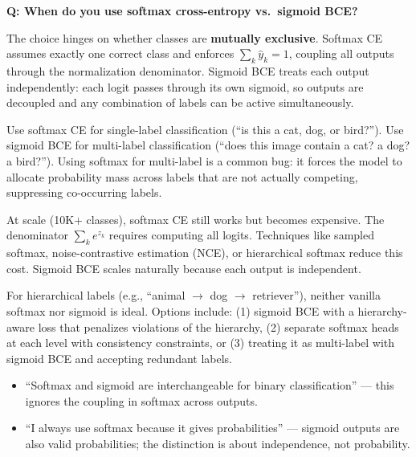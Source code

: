 \begin{interviewq}
\textbf{Q: When do you use softmax cross-entropy vs.\ sigmoid BCE?}

 \quad {} \quad \badgefreq{\freqhigh}

\stronganswer The choice hinges on whether classes are \textbf{mutually exclusive}. Softmax CE assumes exactly one correct class and enforces $\sum_k \hat{y}_k = 1$, coupling all outputs through the normalization denominator. Sigmoid BCE treats each output independently: each logit passes through its own sigmoid, so outputs are decoupled and any combination of labels can be active simultaneously.

Use softmax CE for single-label classification (``is this a cat, dog, or bird?''). Use sigmoid BCE for multi-label classification (``does this image contain a cat? a dog? a bird?''). Using softmax for multi-label is a common bug: it forces the model to allocate probability mass across labels that are not actually competing, suppressing co-occurring labels.

At scale (10K+ classes), softmax CE still works but becomes expensive. The denominator $\sum_k e^{z_k}$ requires computing all logits. Techniques like sampled softmax, noise-contrastive estimation (NCE), or hierarchical softmax reduce this cost. Sigmoid BCE scales naturally because each output is independent.

For hierarchical labels (e.g., ``animal $\to$ dog $\to$ retriever''), neither vanilla softmax nor sigmoid is ideal. Options include: (1) sigmoid BCE with a hierarchy-aware loss that penalizes violations of the hierarchy, (2) separate softmax heads at each level with consistency constraints, or (3) treating it as multi-label with sigmoid BCE and accepting redundant labels.

\redflags
\begin{itemize}
    \item ``Softmax and sigmoid are interchangeable for binary classification'' --- this ignores the coupling in softmax across outputs.
    \item ``I always use softmax because it gives probabilities'' --- sigmoid outputs are also valid probabilities; the distinction is about independence, not probability.
\end{itemize}



\end{interviewq}
